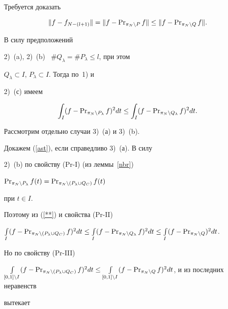 \begin{pf}


Требуется доказать


\begin{equation}


\|f-f_{N-(l+1)}\|=\|f-\PR_{\pi_N\setminus P}f\|\leq\|f-\PR_{\pi_N


\setminus Q}f\|. \label{ast}


\end{equation}


В силу предположений


2)~(a), 2)~(b) \ $\#Q_{\lambda}=\#P_{\lambda}\leq l$, при этом


$Q_{\lambda}\subset I$, $P_{\lambda}\subset I$. Тогда по~1) и


2)~(с) имеем


\begin{equation}


\int_{I}(f-\PR_{\pi_N\setminus P_{\lambda}}f)^2dt


\leq\int_{I}(f-\PR_{\pi_N\setminus {Q_{\lambda}}} f)^2 dt.


\label{**}


\end{equation}


Рассмотрим отдельно случаи 3)~(а) и 3)~(b).


Докажем (\ref{ast}), если справедливо 3)~(а). В силу


2)~(b) по свойству (Pr-I) (из леммы~\ref{nbr})


$\PR_{\pi_N\setminus


P_{\lambda}}f(t)=\PR_{\pi_N\setminus (P_{\lambda}\cup Q_C)}f(t)$


при $t\in I$.


Поэтому из (\ref{**}) и свойства (Pr-II)


$\int\limits_{I}(f-\PR_{\pi_N\setminus(P_{\lambda}\cup Q_C)} f)^2dt


\leq \int\limits_{I}(f-\PR_{\pi_N\setminus {Q_{\lambda}}}f)^2dt\leq


\int\limits_{I}(f-\PR_{\pi_N\setminus {Q}} )^2 dt$.


Но по свойству (Pr-III)


$\int\limits_{[0,1]\setminus I} (f-\PR_{\pi_N\setminus


(P_{\lambda} \cup Q_C)}f)^2 dt\leq\int\limits_{[0,1]\setminus


I}(f-\PR_{\pi_N\setminus Q }f)^2 dt$, и из последних неравенств


вытекает



\end{pf}
